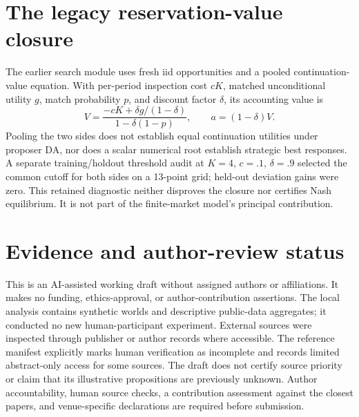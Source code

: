 \documentclass[11pt,a4paper]{article}
\begin{document}
\section{The legacy reservation-value closure}
The earlier search module uses fresh iid opportunities and a pooled continuation-value equation. With per-period inspection cost $cK$, matched unconditional utility $g$, match probability $p$, and discount factor $\delta$, its accounting value is
\begin{equation}
V=\frac{-cK+\delta g/(1-\delta)}{1-\delta(1-p)},\qquad a=(1-\delta)V.
\end{equation}
Pooling the two sides does not establish equal continuation utilities under proposer DA, nor does a scalar numerical root establish strategic best responses. A separate training/holdout threshold audit at $K=4$, $c=.1$, $\delta=.9$ selected the common cutoff for both sides on a 13-point grid; held-out deviation gains were zero. This retained diagnostic neither disproves the closure nor certifies Nash equilibrium. It is not part of the finite-market model's principal contribution.

\section{Evidence and author-review status}
This is an AI-assisted working draft without assigned authors or affiliations. It makes no funding, ethics-approval, or author-contribution assertions. The local analysis contains synthetic worlds and descriptive public-data aggregates; it conducted no new human-participant experiment. External sources were inspected through publisher or author records where accessible. The reference manifest explicitly marks human verification as incomplete and records limited abstract-only access for some sources. The draft does not certify source priority or claim that its illustrative propositions are previously unknown. Author accountability, human source checks, a contribution assessment against the closest papers, and venue-specific declarations are required before submission.

\small

\end{document}
